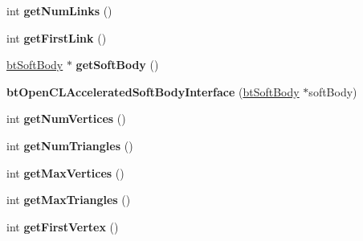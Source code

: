 \begin{DoxyCompactItemize}
\mbox{\label{classbtOpenCLAcceleratedSoftBodyInterface_a0d84887f62ccdccebbbedb2e5cdaceeb}} 
int {\bfseries get\+Num\+Links} ()
\item 
\mbox{\label{classbtOpenCLAcceleratedSoftBodyInterface_a0fbef20e44f5428f9ba489b7a3094bce}} 
int {\bfseries get\+First\+Link} ()
\item 
\mbox{\label{classbtOpenCLAcceleratedSoftBodyInterface_ae3d88843eb2bed78d651e0f5299d01a6}} 
\hyperlink{classbtSoftBody}{bt\+Soft\+Body} $\ast$ {\bfseries get\+Soft\+Body} ()
\item 
\mbox{\label{classbtOpenCLAcceleratedSoftBodyInterface_a0a1876d09fadf797d65cb9917ca86e87}} 
{\bfseries bt\+Open\+C\+L\+Accelerated\+Soft\+Body\+Interface} (\hyperlink{classbtSoftBody}{bt\+Soft\+Body} $\ast$soft\+Body)
\item 
\mbox{\label{classbtOpenCLAcceleratedSoftBodyInterface_a969a40bb22b69af274843499bf48416c}} 
int {\bfseries get\+Num\+Vertices} ()
\item 
\mbox{\label{classbtOpenCLAcceleratedSoftBodyInterface_a577f0e851770e756515294ca475bcef3}} 
int {\bfseries get\+Num\+Triangles} ()
\item 
\mbox{\label{classbtOpenCLAcceleratedSoftBodyInterface_a4c3cf743e4af762e1e985da0aab05412}} 
int {\bfseries get\+Max\+Vertices} ()
\item 
\mbox{\label{classbtOpenCLAcceleratedSoftBodyInterface_a500adc07a0d67e6574d30bce3e12e240}} 
int {\bfseries get\+Max\+Triangles} ()
\item 
\mbox{\label{classbtOpenCLAcceleratedSoftBodyInterface_a40343ab4b8206db1f23881944326a831}} 
int {\bfseries get\+First\+Vertex} ()
\item 
\mbox{\label{classbtOpenCLAcceleratedSoftBodyInterface_aff3b22ed5bc522dcdb53f85bfda0c730}} 

\end{DoxyCompactItemize}
